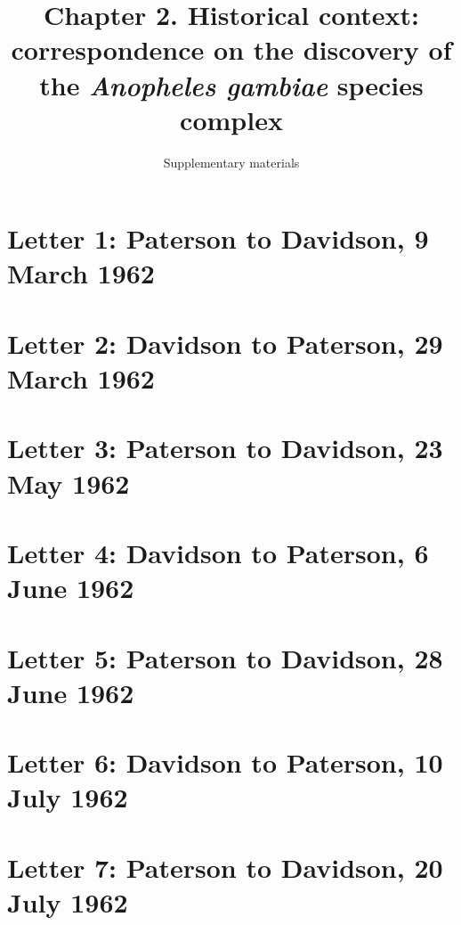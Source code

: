 \documentclass[a4paper,11pt,abstracton,hidelinks]{scrartcl}
\title{
Chapter 2. Historical context: correspondence on the discovery of the \textit{Anopheles gambiae} species complex
}
\subtitle{Supplementary materials}
\author{}
\begin{document}
\maketitle


\tableofcontents


\clearpage

\section{Letter 1: Paterson to Davidson, 9 March 1962}


\section{Letter 2: Davidson to Paterson, 29 March 1962}


\section{Letter 3: Paterson to Davidson, 23 May 1962}


\section{Letter 4: Davidson to Paterson, 6 June 1962}


\section{Letter 5: Paterson to Davidson, 28 June 1962}


\section{Letter 6: Davidson to Paterson, 10 July 1962}


\section{Letter 7: Paterson to Davidson, 20 July 1962}

\end{document}
